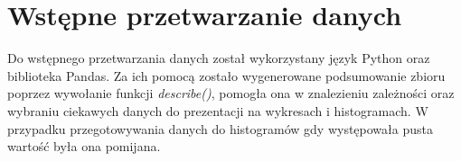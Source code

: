 \documentclass{classrep}
\begin{document}
    \section{Wstępne przetwarzanie danych} {
        Do wstępnego przetwarzania danych został wykorzystany język Python oraz biblioteka Pandas. Za ich pomocą zostało wygenerowane podsumowanie zbioru poprzez wywołanie funkcji \emph{describe()}, pomogła ona w znalezieniu zależności oraz wybraniu ciekawych danych do prezentacji na wykresach i histogramach. W przypadku przegotowywania danych do histogramów gdy występowała pusta wartość była ona pomijana. 
    }

    \begin{thebibliography}{0}
    \end{thebibliography}
\end{document}
